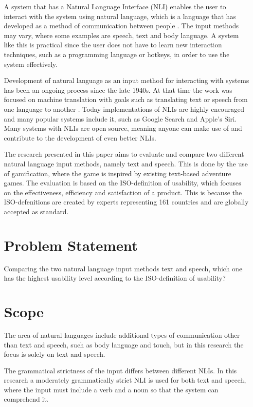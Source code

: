 A system that has a Natural Language Interface (NLI) enables the user to interact with the system using natural language, which is a language that has developed as a method of communication between people \citep{NatLan}. The input methods may vary, where some examples are speech, text and body language. A system like this is practical since the user does not have to learn new interaction techniques, such as a programming language or hotkeys, in order to use the system effectively.

Development of natural language as an input method for interacting with systems has been an ongoing process since the late 1940s. At that time the work was focused on machine translation with goals such as translating text or speech from one language to another \citep{Jones}. Today implementations of NLIs are highly encouraged and many popular systems include it, such as Google Search and Apple's Siri. Many systems with NLIs are open source, meaning anyone can make use of and contribute to the development of even better NLIs.

The research presented in this paper aims to evaluate and compare two different natural language input methods, namely text and speech. This is done by the use of gamification, where the game is inspired by existing text-based adventure games. The evaluation is based on the ISO-definition of usability, which focuses on the effectiveness, efficiency and satisfaction of a product. \citep{ISO} This is because the ISO-defenitions are created by experts representing 161 countries and are globally accepted as standard.

\section{Problem Statement}
Comparing the two natural language input methods text and speech, which one has the highest usability level according to the ISO-definition of usability?

\section{Scope}
The area of natural languages include additional types of communication other than text and speech, such as body language and touch, but in this research the focus is solely on text and speech.

The grammatical strictness of the input differs between different NLIs. In this research a moderately grammatically strict NLI is used for both text and speech, where the input must include a verb and a noun so that the system can comprehend it.

